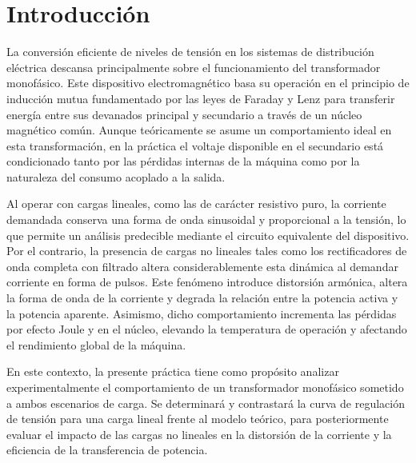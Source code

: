 \section{Introducción}

La conversión eficiente de niveles de tensión en los sistemas de distribución eléctrica descansa principalmente sobre el funcionamiento del transformador monofásico. Este dispositivo electromagnético basa su operación en el principio de inducción mutua fundamentado por las leyes de Faraday y Lenz para transferir energía entre sus devanados principal y secundario a través de un núcleo magnético común. Aunque teóricamente se asume un comportamiento ideal en esta transformación, en la práctica el voltaje disponible en el secundario está condicionado tanto por las pérdidas internas de la máquina como por la naturaleza del consumo acoplado a la salida.

Al operar con cargas lineales, como las de carácter resistivo puro, la corriente demandada conserva una forma de onda sinusoidal y proporcional a la tensión, lo que permite un análisis predecible mediante el circuito equivalente del dispositivo. Por el contrario, la presencia de cargas no lineales tales como los rectificadores de onda completa con filtrado altera considerablemente esta dinámica al demandar corriente en forma de pulsos. Este fenómeno introduce distorsión armónica, altera la forma de onda de la corriente y degrada la relación entre la potencia activa y la potencia aparente. Asimismo, dicho comportamiento incrementa las pérdidas por efecto Joule y en el núcleo, elevando la temperatura de operación y afectando el rendimiento global de la máquina.

En este contexto, la presente práctica tiene como propósito analizar experimentalmente el comportamiento de un transformador monofásico sometido a ambos escenarios de carga. Se determinará y contrastará la curva de regulación de tensión para una carga lineal frente al modelo teórico, para posteriormente evaluar el impacto de las cargas no lineales en la distorsión de la corriente y la eficiencia de la transferencia de potencia.